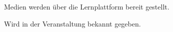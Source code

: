 \begin{course}
\begin{content}
\end{content}

\begin{media}Medien werden über die Lernplattform bereit gestellt.

\end{media}

\begin{literature}Wird in der Veranstaltung bekannt gegeben.

\end{literature}



\end{course}